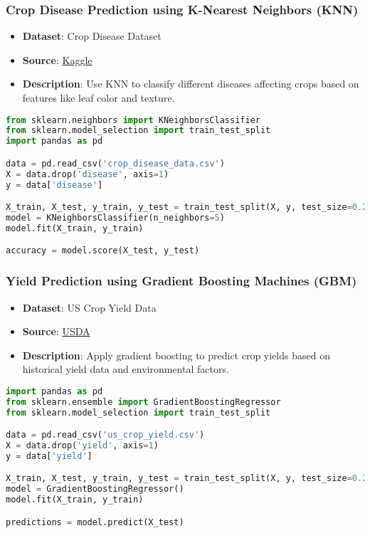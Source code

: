 \begin{frame}[fragile]\frametitle{Crop Disease Prediction using K-Nearest Neighbors (KNN)}
    \begin{itemize}
        \item \textbf{Dataset}: Crop Disease Dataset
        \item \textbf{Source}: \href{https://www.kaggle.com/datasets/ashishpatel26/crop-disease-prediction-dataset}{Kaggle}
        \item \textbf{Description}: Use KNN to classify different diseases affecting crops based on features like leaf color and texture.
    \end{itemize}
    \begin{lstlisting}[language=Python]
from sklearn.neighbors import KNeighborsClassifier
from sklearn.model_selection import train_test_split
import pandas as pd

data = pd.read_csv('crop_disease_data.csv')
X = data.drop('disease', axis=1)
y = data['disease']

X_train, X_test, y_train, y_test = train_test_split(X, y, test_size=0.25)
model = KNeighborsClassifier(n_neighbors=5)
model.fit(X_train, y_train)

accuracy = model.score(X_test, y_test)
    \end{lstlisting}
\end{frame}

\begin{frame}[fragile]\frametitle{Yield Prediction using Gradient Boosting Machines (GBM)}
    \begin{itemize}
        \item \textbf{Dataset}: US Crop Yield Data
        \item \textbf{Source}: \href{https://www.nass.usda.gov/}{USDA}
        \item \textbf{Description}: Apply gradient boosting to predict crop yields based on historical yield data and environmental factors.
    \end{itemize}
    \begin{lstlisting}[language=Python]
import pandas as pd
from sklearn.ensemble import GradientBoostingRegressor
from sklearn.model_selection import train_test_split

data = pd.read_csv('us_crop_yield.csv')
X = data.drop('yield', axis=1)
y = data['yield']

X_train, X_test, y_train, y_test = train_test_split(X, y, test_size=0.2)
model = GradientBoostingRegressor()
model.fit(X_train, y_train)

predictions = model.predict(X_test)
    \end{lstlisting}
\end{frame}

